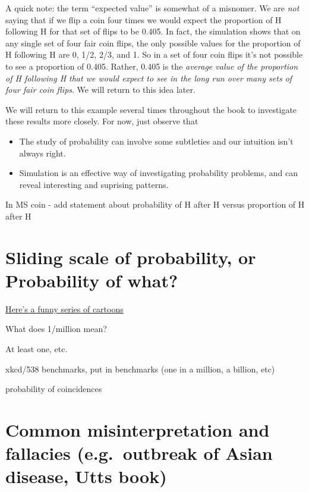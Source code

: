 \documentclass[
]{book}
\providecommand{\tightlist}{%
  \setlength{\itemsep}{0pt}\setlength{\parskip}{0pt}}
\theoremstyle{definition}
\theoremstyle{definition}
\theoremstyle{definition}
\theoremstyle{remark}
\begin{document}
A quick note: the term ``expected value'' is somewhat of a misnomer. We are \emph{not} saying that if we flip a coin four times we would expect the proportion of H following H for that set of flips to be 0.405. In fact, the simulation shows that on any single set of four fair coin flips, the only possible values for the proportion of H following H are 0, 1/2, 2/3, and 1. So in a set of four coin flips it's not possible to see a proportion of 0.405. Rather, 0.405 is the \emph{average value of the proportion of H following H that we would expect to see in the long run over many sets of four fair coin flips}. We will return to this idea later.

We will return to this example several times throughout the book to investigate these results more closely. For now, just observe that

\begin{itemize}
\tightlist
\item
  The study of probability can involve some subtleties and our intuition isn't always right.
\item
  Simulation is an effective way of investigating probability problems, and can reveal interesting and suprising patterns.
\end{itemize}

In MS coin - add statement about probability of H after H versus proportion of H after H

\hypertarget{sliding-scale-of-probability-or-probability-of-what}{%
\section{Sliding scale of probability, or Probability of what?}\label{sliding-scale-of-probability-or-probability-of-what}}

\href{https://mathwithbaddrawings.com/2015/09/23/what-does-probability-mean-in-your-profession/}{Here's a funny series of cartoons}

What does 1/million mean?

At least one, etc.

xkcd/538 benchmarks, put in benchmarks (one in a million, a billion, etc)

probability of coincidences

\hypertarget{common-misinterpretation-and-fallacies-e.g.-outbreak-of-asian-disease-utts-book}{%
\section{Common misinterpretation and fallacies (e.g.~outbreak of Asian disease, Utts book)}\label{common-misinterpretation-and-fallacies-e.g.-outbreak-of-asian-disease-utts-book}}
\end{document}
